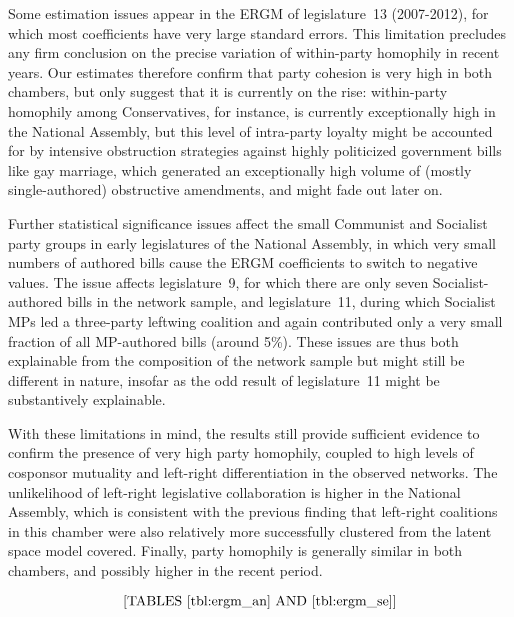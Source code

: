 Some estimation issues appear in the ERGM of legislature~13 (2007-2012), for which most coefficients have very large standard errors. This limitation precludes any firm conclusion on the precise variation of within-party homophily in recent years. Our estimates therefore confirm that party cohesion is very high in both chambers, but only suggest that it is currently on the rise: within-party homophily among Conservatives, for instance, is currently exceptionally high in the National Assembly, but this level of intra-party loyalty might be accounted for by intensive obstruction strategies against highly politicized government bills like gay marriage, which generated an exceptionally high volume of (mostly single-authored) obstructive amendments, and might fade out later on.%

Further statistical significance issues affect the small Communist and Socialist party groups in early legislatures of the National Assembly, in which very small numbers of authored bills cause the ERGM coefficients to switch to negative values. The issue affects legislature~9, for which there are only seven Socialist-authored bills in the network sample, and legislature~11, during which Socialist MPs led a three-party leftwing coalition and again contributed only a very small fraction of all MP-authored bills (around 5\%). These issues are thus both explainable from the composition of the network sample but might still be different in nature, insofar as the odd result of legislature~11 might be substantively explainable.%

With these limitations in mind, the results still provide sufficient evidence to confirm the presence of very high party homophily, coupled to high levels of cosponsor mutuality and left-right differentiation in the observed networks. The unlikelihood of left-right legislative collaboration is higher in the National Assembly, which is consistent with the previous finding that left-right coalitions in this chamber were also relatively more successfully clustered from the latent space model covered. Finally, party homophily is generally similar in both chambers, and possibly higher in the recent period.%

$$\textrm{[TABLES~\ref{tbl:ergm_an} AND~\ref{tbl:ergm_se}]}$$

